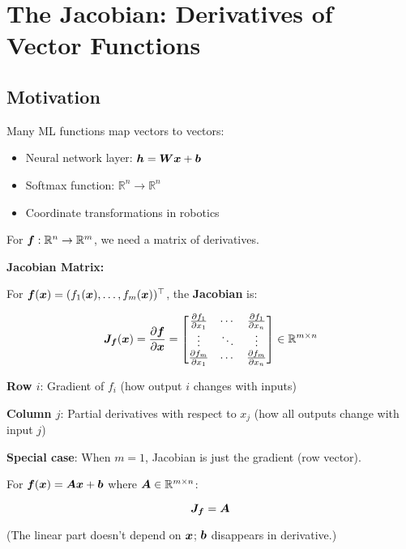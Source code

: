 \section{The Jacobian: Derivatives of Vector Functions}

\subsection{Motivation}

Many ML functions map vectors to vectors:
\begin{itemize}
    \item Neural network layer: $\bm{h} = \bm{Wx} + \bm{b}$
    \item Softmax function: $\mathbb{R}^n \to \mathbb{R}^n$
    \item Coordinate transformations in robotics
\end{itemize}

For $\bm{f}: \mathbb{R}^n \to \mathbb{R}^m$, we need a matrix of derivatives.

\begin{seanbox}{6.3}
\textbf{Jacobian Matrix:}

For $\bm{f}(\bm{x}) = (f_1(\bm{x}), \ldots, f_m(\bm{x}))^\top$, the \textbf{Jacobian} is:

\begin{equation}
    \bm{J}_{\bm{f}}(\bm{x}) = \frac{\partial \bm{f}}{\partial \bm{x}} = \begin{bmatrix}
        \frac{\partial f_1}{\partial x_1} & \cdots & \frac{\partial f_1}{\partial x_n} \\
        \vdots & \ddots & \vdots \\
        \frac{\partial f_m}{\partial x_1} & \cdots & \frac{\partial f_m}{\partial x_n}
    \end{bmatrix} \in \mathbb{R}^{m \times n}
\end{equation}

\textbf{Row $i$}: Gradient of $f_i$ (how output $i$ changes with inputs)

\textbf{Column $j$}: Partial derivatives with respect to $x_j$ (how all outputs change with input $j$)

\textbf{Special case}: When $m = 1$, Jacobian is just the gradient (row vector).
\end{seanbox}

\begin{example}
For $\bm{f}(\bm{x}) = \bm{Ax} + \bm{b}$ where $\bm{A} \in \mathbb{R}^{m \times n}$:

\begin{equation}
    \bm{J}_{\bm{f}} = \bm{A}
\end{equation}

(The linear part doesn't depend on $\bm{x}$; $\bm{b}$ disappears in derivative.)
\end{example}

